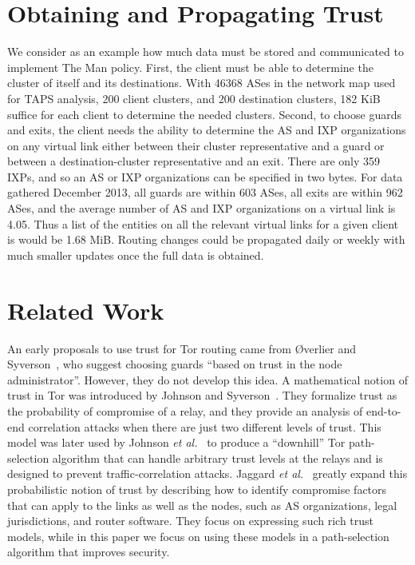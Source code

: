 \documentclass[conference]{styles/IEEEtran}
\newcommand{\etal}{\emph{et al.}}
\newcommand{\ps}{TAPS\xspace}
\begin{document}
%
 

\section{Obtaining and Propagating Trust}\label{sec:propagation}












We consider as an example how much data must be stored and communicated
to implement \textsf{The Man} policy.
First, the client must be able to determine the cluster of itself and its
destinations. With 46368 ASes in the network map used for \ps analysis,
200 client clusters, and 200 destination
clusters, 182 KiB suffice for each client to determine the needed clusters.
Second, to choose guards and exits, the client needs the ability to
determine the AS and IXP organizations on any virtual link either
between their cluster representative and a guard or between
a destination-cluster representative and an exit. There are only 359
IXPs, and so an AS or IXP organizations can be specified in two bytes.
For data gathered December 2013, all guards are within 603 ASes, all
exits are within 962 ASes, and the average number of AS and IXP
organizations on a virtual link is 4.05. Thus a
list of the entities on all the relevant virtual links for a given
client is would be 1.68 MiB.
Routing changes could be propagated daily or weekly with much smaller
updates once the full data is obtained.






 \section{Related Work}
\label{sec:related}
An early proposals to use trust for Tor routing
came from {\O}verlier and
Syverson~\cite{hs-attack06}, who suggest choosing guards
``based on trust in the node administrator''. However, they do not
develop this idea.
A mathematical notion of trust in Tor was introduced by Johnson and
Syverson~\cite{trusted-set}. They formalize trust as the probability
of compromise of a relay, and they provide an analysis
of end-to-end correlation attacks when there are just two different
levels of trust. This model was later used by Johnson
\etal{}~\cite{jsdm11ccs} to produce a ``downhill'' Tor path-selection
algorithm that can handle arbitrary trust levels at the relays and
is designed to prevent traffic-correlation attacks.
Jaggard \etal{}~\cite{trustrep-popets14} greatly expand this
probabilistic notion of trust by describing how to identify
compromise factors that can apply to the links as well as the nodes,
such as AS organizations, legal jurisdictions, and router software.
They focus on expressing such rich trust models,
while in this paper we focus on using these models in a path-selection
algorithm that improves security.
\end{document}
